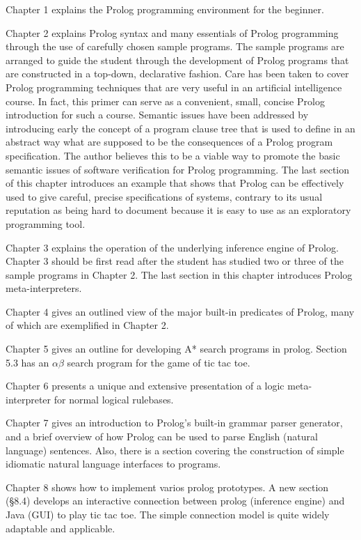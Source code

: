 Chapter 1 explains the Prolog programming environment for the beginner.

Chapter 2 explains Prolog syntax and many essentials of Prolog programming
through the use of carefully chosen sample programs. The sample programs are
arranged to guide the student through the development of Prolog programs that
are constructed in a top-down, declarative fashion. Care has been taken to cover
Prolog programming techniques that are very useful in an artificial intelligence
course. In fact, this primer can serve as a convenient, small, concise Prolog
introduction for such a course. Semantic issues have been addressed by
introducing early the concept of a program clause tree that is used to define in
an abstract way what are supposed to be the consequences of a Prolog program
specification. The author believes this to be a viable way to promote the basic
semantic issues of software verification for Prolog programming. The last
section of this chapter introduces an example that shows that Prolog can be
effectively used to give careful, precise specifications of systems, contrary to
its usual reputation as being hard to document because it is easy to use as an
exploratory programming tool.

Chapter 3 explains the operation of the underlying inference engine of Prolog.
Chapter 3 should be first read after the student has studied two or three of the
sample programs in Chapter 2. The last section in this chapter introduces Prolog
meta-interpreters.

Chapter 4 gives an outlined view of the major built-in predicates of Prolog,
many of which are exemplified in Chapter 2.

Chapter 5 gives an outline for developing A* search programs in prolog.  Section
5.3 has an $\alpha\beta$ search program for the game of tic tac toe.

Chapter 6 presents a unique and extensive presentation of a logic
meta-interpreter for normal logical rulebases.

Chapter 7 gives an introduction to Prolog's built-in grammar parser generator,
and a brief overview of how Prolog can be used to parse English (natural
language) sentences. Also, there is a section covering the construction of
simple idiomatic natural language interfaces to programs.

Chapter 8 shows how to implement varios prolog prototypes. A new section (§8.4)
develops an interactive connection between prolog (inference engine) and Java
(GUI) to play tic tac toe. The simple connection model is quite widely adaptable
and applicable.


